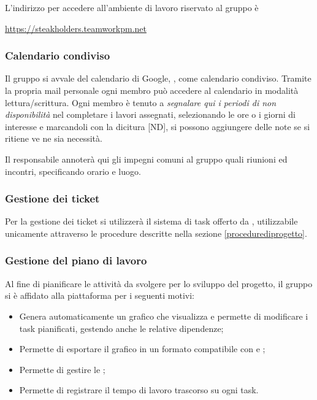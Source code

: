 		L'indirizzo per accedere all'ambiente di lavoro riservato al gruppo è
		\begin{center}
			\url{https://steakholders.teamworkpm.net}
		\end{center}
		
		\subsubsection{Calendario condiviso}
		\label{Calendario condiviso}
				
		Il gruppo si avvale del calendario di Google, , come calendario condiviso.
		Tramite la propria mail personale ogni membro può accedere al calendario in modalità lettura/scrittura.
		Ogni membro è tenuto a \emph{segnalare qui i periodi di non disponibilità} nel completare i lavori assegnati, selezionando le ore o i giorni di interesse e marcandoli con la dicitura [ND], si possono aggiungere delle note se si ritiene ve ne sia necessità. 
		
		Il responsabile annoterà qui gli impegni comuni al gruppo quali riunioni ed incontri, specificando orario e luogo.
		
		\subsubsection{Gestione dei ticket}
		\label{teamwork}
		Per la gestione dei ticket si utilizzerà il sistema di task offerto da , utilizzabile unicamente attraverso le procedure descritte nella sezione \ref{procedurediprogetto}.
		
		\subsubsection{Gestione del piano di lavoro}
		
		Al fine di pianificare le attività da svolgere per lo sviluppo del progetto, il gruppo si è affidato alla piattaforma  per i seguenti motivi:
		\begin{itemize}
			\item Genera automaticamente un grafico  che visualizza e permette di modificare i task pianificati, gestendo anche le relative dipendenze;
			\item Permette di esportare il grafico  in un formato compatibile con  e ;
			\item Permette di gestire le ;
			\item Permette di registrare il tempo di lavoro trascorso su ogni task.
		\end{itemize}

